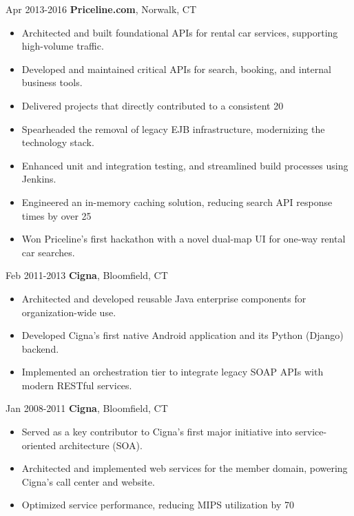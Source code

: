 \documentclass[a4paper,online]{adcv}
\begin{document}
\begin{adcvtabletwo}
		\adcvrowskip
		\adcvrowskip
		 {Apr 2013-2016}
		{\textbf{Priceline.com}, Norwalk, CT}
		\begin{itemize}
			\item Architected and built foundational APIs for rental car services, supporting high-volume traffic.
			\item Developed and maintained critical APIs for search, booking, and internal business tools.
			\item Delivered projects that directly contributed to a consistent 20%
			\item Spearheaded the removal of legacy EJB infrastructure, modernizing the technology stack.
			\item Enhanced unit and integration testing, and streamlined build processes using Jenkins.
			\item Engineered an in-memory caching solution, reducing search API response times by over 25%
			\item Won Priceline's first hackathon with a novel dual-map UI for one-way rental car searches.
		\end{itemize}
		\adcvrowskip
		
		\adcvrowskip
		\adcvrowskip
		 {Feb 2011-2013}
		{\textbf{Cigna}, Bloomfield, CT}
		\begin{itemize}
			\item Architected and developed reusable Java enterprise components for organization-wide use.
			\item Developed Cigna's first native Android application and its Python (Django) backend.
			\item Implemented an orchestration tier to integrate legacy SOAP APIs with modern RESTful services.
		\end{itemize}
		\adcvrowskip
		
		\adcvrowskip
		\adcvrowskip
		 {Jan 2008-2011}
		{\textbf{Cigna}, Bloomfield, CT}
		\begin{itemize}
			\item Served as a key contributor to Cigna's first major initiative into service-oriented architecture (SOA).
			\item Architected and implemented web services for the member domain, powering Cigna's call center and website.
			\item Optimized service performance, reducing MIPS utilization by 70%
		\end{itemize}
		\adcvrowskip
		

\end{adcvtabletwo}
\end{document}
